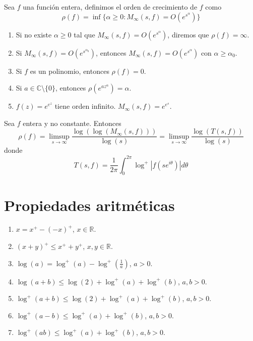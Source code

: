 \begin{definition}
    Sea $f$ una función entera, definimos el orden de crecimiento de $f$ como
    $$\rho(f) = \inf\{\alpha \geq 0 : M_\infty(s, f) = O(e^{s^\alpha})\}$$
\end{definition}

\begin{remark}
    \hfill
    \begin{enumerate}
        \item Si no existe $\alpha \geq 0$ tal que $M_\infty(s, f) = O(e^{s^\alpha})$, diremos que $\rho(f) = \infty$.
        \item Si $M_\infty(s, f) = O(e^{s^{\alpha_0}})$, entonces $M_\infty(s, f) = O(e^{s^\alpha})$ con $\alpha \geq \alpha_0$.
        \item Si $f$ es un polinomio, entonces $\rho(f) = 0$.
        \item Si $a \in \mathbb{C} \setminus \{0\}$, entonces $\rho(e^{az^\alpha}) = \alpha$.
        \item $f(z) = e^{e^z}$ tiene orden infinito.
              $M_\infty(s, f) = e^{e^s}$.
    \end{enumerate}
\end{remark}

\begin{proposition}
    Sea $f$ entera y no constante.
    Entonces
    $$\rho(f) = \limsup_{s \to \infty} \frac{\log(\log(M_\infty(s, f)))}{\log(s)} = \limsup_{s \to \infty} \frac{\log(T(s, f))}{\log(s)}$$
    donde
    $$T(s, f) = \frac{1}{2\pi} \int_0^{2\pi} \log^+|f(se^{i\theta})|d\theta$$
\end{proposition}


\section{Propiedades aritméticas}
\begin{lemma}
    \hfill
    \begin{enumerate}
        \item $x = x^+ - (-x)^+$, $x \in \mathbb{R}$.
        \item $(x+y)^+ \leq x^+ + y^+$, $x, y \in \mathbb{R}$.
        \item $\log(a) = \log^+(a) - \log^+\left(\frac{1}{a}\right)$, $a > 0$.
        \item $\log(a+b) \leq \log(2) + \log^+(a) + \log^+(b)$, $a, b > 0$.
        \item $\log^+(a+b) \leq \log(2) + \log^+(a) + \log^+(b)$, $a, b > 0$.
        \item $\log^+(a-b) \leq \log^+(a) + \log^+(b)$, $a, b > 0$.
        \item $\log^+(ab) \leq \log^+(a) + \log^+(b)$, $a, b > 0$.
    \end{enumerate}
\end{lemma}

